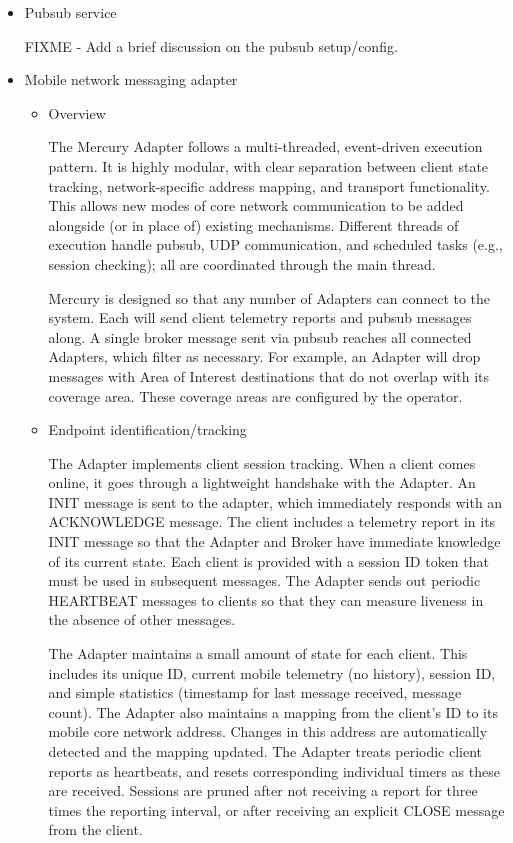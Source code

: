 \begin{itemize}
\begin{itemize}
  \end{itemize}

\item Pubsub service

  FIXME - Add a brief discussion on the pubsub setup/config.

\item Mobile network messaging adapter
  \begin{itemize}
  \item Overview

  The Mercury Adapter follows a multi-threaded, event-driven execution
  pattern. It is highly modular, with clear separation between client
  state tracking, network-specific address mapping, and transport
  functionality.  This allows new modes of core network communication
  to be added alongside (or in place of) existing mechanisms.
  Different threads of execution handle pubsub, UDP communication, and
  scheduled tasks (e.g., session checking); all are coordinated
  through the main thread.

  Mercury is designed so that any number of Adapters can connect to
  the \pubsub system. Each will send client telemetry reports and
  pubsub messages along. A single broker message sent via pubsub
  reaches all connected Adapters, which filter as necessary. For
  example, an Adapter will drop messages with Area of Interest
  destinations that do not overlap with its coverage area. These
  coverage areas are configured by the operator.
  
  \item Endpoint identification/tracking

  The Adapter implements client session tracking. When a client comes
  online, it goes through a lightweight handshake with the Adapter. An
  INIT message is sent to the adapter, which immediately responds with
  an ACKNOWLEDGE message. The client includes a telemetry report in
  its INIT message so that the Adapter and Broker have immediate
  knowledge of its current state. Each client is provided with a
  session ID token that must be used in subsequent messages.  The
  Adapter sends out periodic HEARTBEAT messages to clients so that
  they can measure liveness in the absence of other messages.

  The Adapter maintains a small amount of state for each client. This
  includes its unique ID, current mobile telemetry (no history),
  session ID, and simple statistics (timestamp for last message
  received, message count). The Adapter also maintains a mapping from
  the client's ID to its mobile core network address. Changes in this
  address are automatically detected and the mapping updated. The
  Adapter treats periodic client reports as heartbeats, and resets
  corresponding individual timers as these are received. Sessions are
  pruned after not receiving a report for three times the reporting
  interval, or after receiving an explicit CLOSE message from the client.


\end{itemize}
\end{itemize}

